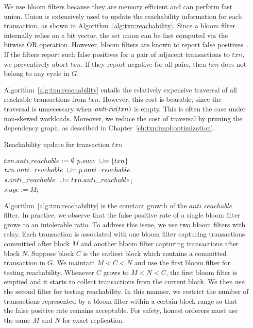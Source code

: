 We use bloom filters because they are memory efficient and can perform
fast union.
%
Union is extensively used to update the reachability information for each
transaction, as shown in Algorithm~\ref{alg:txn:reachability}.
%
Since a bloom filter internally relies on a bit vector, the set union can be
fast computed via the bitwise OR operation.
%
However, bloom filters are known to report false positives~\cite{bloom1970space}.
%
If the filters report such false positives for a pair of adjacent transactions
to $txn$, we preventively abort $txn$.
%
If they report negative for all pairs, then $txn$ does not belong to any
cycle in $G$.

Algorithm~\ref{alg:txn:reachability} entails the relatively expensive traversal of all
reachable transactions from $txn$.
%
However, this cost is bearable, since the traversal is unnecessary when
$\textit{anti-rw}(txn)$ is empty.
%
This is often the case under non-skewed workloads.
%
Moreover, we reduce the cost of traversal by pruning the dependency graph, as described in Chapter~\ref{ch:txn:impl:optimization}.

\begin{algorithm}
  \caption{Reachability update for transaction $txn$}
  \label{alg:txn:reachability}

  $txn.anti\_reachable$ := $\emptyset$\;
   {
      $p.succ \ \mathrel{{\cup}{=}} \{txn\}$\;
      $txn.anti\_reachable \ \mathrel{{\cup}{=}}
      p.anti\_reachable$\; }
   {
      $s.anti\_reachable \ \mathrel{{\cup}{=}}
      txn.anti\_reachable$;\\
      $s.age := M$;\label{alg:txn:age}}
\end{algorithm}

Algorithm~\ref{alg:txn:reachability} is the constant growth of the
$anti\_reachable$ filter.
%
In practice, we observe that the false positive rate of a single bloom filter
grows to an intolerable ratio.
%
To address this issue, we use two bloom filters with relay.
%
Each transaction is associated with one bloom filter capturing transactions
committed after block $M$ and another bloom filter capturing transactions after
block $N$.
%
Suppose block $C$ is the earliest block which contains a committed transaction
in $G$.
%
We maintain $M < C < N$ and use the first bloom filter for testing reachability.
%
Whenever $C$ grows to $M < N < C$, the first bloom filter is emptied and it
starts to collect transactions from the current block.
%
We then use the second filter for testing reachability.
%
In this manner, we restrict the number of transactions represented by a bloom
filter within a certain block range so that the false positive rate remains
acceptable. 
%
For safety, honest orderers must use the same $M$ and $N$ for exact replication.


